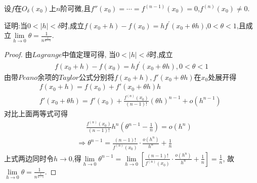\documentclass[lang=cn,newtx,10pt,scheme=chinese]{../Template/elegantbook}
\begin{document}
\begin{exercise}
    设\(f\)在\(O_{\delta}(x_0)\)上\(n\)阶可微,且\(f''(x_0)=\cdots =f^{(n - 1)}(x_0)=0\),\(f^{(n)}(x_0)\neq0\).
    
    证明:当\(0<|h|<\delta\)时,成立\(f(x_0 + h)-f(x_0)=hf^{\prime}(x_0+\theta h)\),\(0<\theta<1\),且成立$\lim\limits_{h\to0}\theta=\frac{1}{n^{\frac{1}{n - 1}}}$.
\end{exercise}
    \begin{proof}
        由$Lagrange$中值定理可得,
        当\(0<|h|<\delta\)时,成立
        \begin{gather}
            f(x_0 + h)-f(x_0)=hf^{\prime}(x_0+\theta h),0<\theta<1
            \nonumber
        \end{gather}
        由带$Peano$余项的$Taylor$公式分别将$f\left( x_0+h \right),f'\left( x_0+\theta h \right)$在$x_0$处展开得
        \begin{gather}
            f\left( x_0+h \right) =f\left( x_0 \right) +f'\left( x_0+\theta h \right) h
            \nonumber\\
            f'\left( x_0+\theta h \right) =f'\left( x_0 \right) +\frac{f^{\left( n \right)}\left( x_0 \right)}{\left( n-1 \right) !}\left( \theta h \right) ^{n-1}+o\left( h^{n-1} \right) \,\,
            \nonumber
        \end{gather}
        对比上面两等式可得
        \begin{equation}
            \begin{split}
                &\,\,\,\,\,\,\,\,\frac{f^{\left( n \right)}\left( x_0 \right)}{\left( n-1 \right) !}h^n\left( \theta ^{n-1}-\frac{1}{n} \right) =o\left( h^n \right) 
                \\
                &\Rightarrow \theta ^{n-1}=\frac{\left( n-1 \right) !}{f^{\left( n \right)}\left( x_0 \right)}\cdot \frac{o\left( h^n \right)}{h^n}+\frac{1}{n}    
            \end{split}
            \nonumber
        \end{equation}
        上式两边同时令$h\to0$,得$\underset{h\rightarrow 0}{\lim}\theta ^{n-1}=\underset{h\rightarrow 0}{\lim}\left[ \frac{\left( n-1 \right) !}{f^{\left( n \right)}\left( x_0 \right)}\cdot \frac{o\left( h^n \right)}{h^n}+\frac{1}{n} \right] =\frac{1}{n}$,
        故$\underset{h\rightarrow 0}{\lim}\theta =\frac{1}{n^{\frac{1}{n-1}}}$.
    \end{proof}
\end{document}
